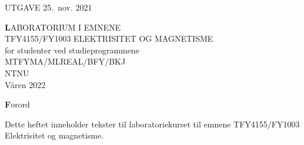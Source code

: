 \documentclass[../Elmag-labhefte-2021.tex]{subfiles}
\begin{document}
\hfill UTGAVE 25.\ nov. 2021 
\vspace*{40mm}
\begin{center}
\LARGE \textbf LABORATORIUM I EMNENE \\[10mm]
TFY4155/FY1003 ELEKTRISITET OG MAGNETISME \\[20mm]    
for studenter ved studieprogrammene\\[10mm]    
MTFYMA/MLREAL/BFY/BKJ \\[15mm]    
NTNU\\[15mm]    
Våren 2022
\end{center}


\newpage
\phantom{.}

\newpage
{}
{\large \textbf Forord}

Dette heftet inneholder tekster til laboratoriekurset til emnene TFY4155/FY1003 Elektrisitet og magnetisme. %




\end{document}
